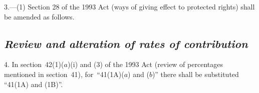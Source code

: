 \documentclass[12pt,a4paper]{article}
\begin{document}
3.---(1) Section 28 of the 1993 Act (ways of giving effect to protected rights) shall be amended as follows.


%
%
%


\subsection*{\itshape Review and alteration of rates of contribution}

4. In section~42(1)($a$)(i)  and (3)  of the 1993 Act (review of percentages mentioned in section~41), for~“41(1A)($a$)  and ($b$)” there shall be substituted “41(1A)  and (1B)”.
\end{document}
